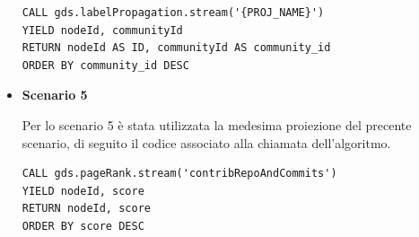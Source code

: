 \documentclass[11pt]{article}
\begin{document}
\begin{itemize}
\begin{lstlisting}[style = all, style=CypherStyle] 
CALL gds.labelPropagation.stream('{PROJ_NAME}')
YIELD nodeId, communityId
RETURN nodeId AS ID, communityId AS community_id
ORDER BY community_id DESC
\end{lstlisting}

\item \textbf{Scenario 5}

Per lo scenario 5 è stata utilizzata la medesima proiezione del precente scenario, di seguito il codice associato alla chiamata dell'algoritmo.

\begin{lstlisting}[style = all, style=CypherStyle] 
CALL gds.pageRank.stream('contribRepoAndCommits')
YIELD nodeId, score
RETURN nodeId, score
ORDER BY score DESC
\end{lstlisting}
\end{itemize}


\end{document}

